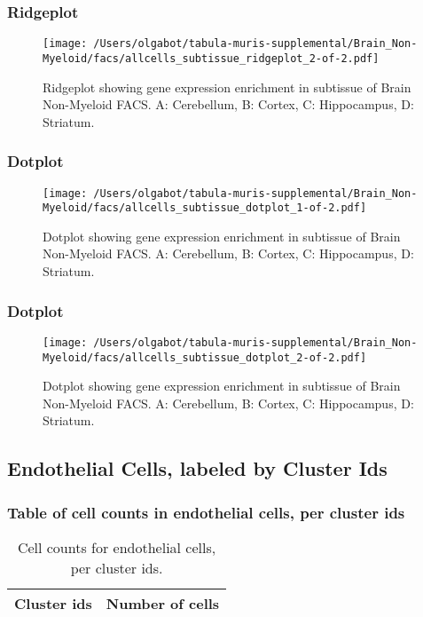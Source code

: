 \clearpage
\clearpage
\subsubsection{Ridgeplot}
\begin{figure}[h]
\centering
\texttt{[image: /Users/olgabot/tabula-muris-supplemental/Brain\_Non-Myeloid/facs/allcells\_subtissue\_ridgeplot\_2-of-2.pdf]}

\caption{ Ridgeplot  showing gene expression enrichment in subtissue of Brain Non-Myeloid FACS. A: Cerebellum, B: Cortex, C: Hippocampus, D: Striatum.}
\end{figure}


\clearpage
\clearpage
\subsubsection{Dotplot}
\begin{figure}[h]
\centering
\texttt{[image: /Users/olgabot/tabula-muris-supplemental/Brain\_Non-Myeloid/facs/allcells\_subtissue\_dotplot\_1-of-2.pdf]}

\caption{ Dotplot  showing gene expression enrichment in subtissue of Brain Non-Myeloid FACS. A: Cerebellum, B: Cortex, C: Hippocampus, D: Striatum.}
\end{figure}


\clearpage
\clearpage
\subsubsection{Dotplot}
\begin{figure}[h]
\centering
\texttt{[image: /Users/olgabot/tabula-muris-supplemental/Brain\_Non-Myeloid/facs/allcells\_subtissue\_dotplot\_2-of-2.pdf]}

\caption{ Dotplot  showing gene expression enrichment in subtissue of Brain Non-Myeloid FACS. A: Cerebellum, B: Cortex, C: Hippocampus, D: Striatum.}
\end{figure}


\clearpage
\subsection{Endothelial Cells, labeled by Cluster Ids}
\subsubsection{Table of cell counts in endothelial cells, per cluster ids}\begin{table}[h]
\centering
\label{my-label}
\begin{tabular}{@{}ll@{}}
\toprule

Cluster ids& Number of cells \\ \midrule\bottomrule
\end{tabular}
\caption{Cell counts for endothelial cells, per cluster ids.}
\end{table}

